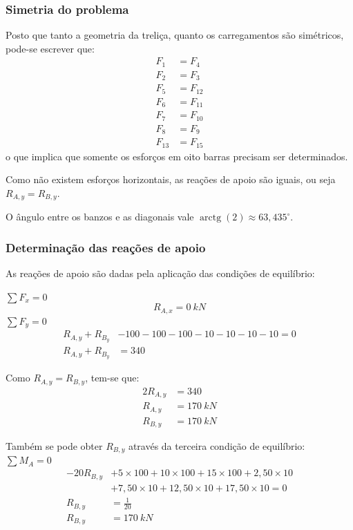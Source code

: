 \documentclass[a4paper, 12pt]{article} %
\DeclareMathOperator{\arctg}{arctg}
\begin{document}
\subsubsection{Simetria do problema}
Posto que tanto a geometria da treliça, quanto os carregamentos são simétricos, pode-se escrever que:
\begin{align}
F_1 &= F_4 \\
F_2 &= F_3 \\
F_5 &= F_{12} \\
F_6 &= F_{11} \\
F_7 &= F_{10} \\
F_8 &= F_9 \\
F_{13} &= F_{15} 
\end{align}
o que implica que somente os esforços em oito barras precisam ser determinados. 

Como não existem esforços horizontais, as reações de apoio são iguais, ou seja $R_{A,y} = R_{B, y}$.

\def\angulodiagonais{63,435^\circ}
O ângulo entre os banzos e as diagonais vale $\arctg({2}) \approx \angulodiagonais$.

\subsubsection{Determinação das reações de apoio}

As reações de apoio são dadas pela aplicação das condições de equilíbrio:

{\noindent $\sum F_x = 0$}
\begin{equation}
    R_{A,x} = \qty{0}{kN}
\end{equation}
{\noindent $\sum F_y = 0$}
\begin{align}
      R_{A,y} + R_{B_y} &- 100 - 100 - 100 - 10 - 10 - 10 - 10 = 0\\
      R_{A,y} + R_{B_y} & = 340
\end{align}

Como $R_{A,y} = R_{B,y}$, tem-se que:
\begin{align}
    2R_{A,y} &= 340 \\
    R_{A,y} & = \qty{170}{kN} \\
    R_{B,y} & = \qty{170}{kN}
\end{align}

Também se pode obter $R_{B,y}$ através da terceira condição de equilíbrio:
{\noindent $\sum M_A = 0$}
\begin{align}
    -20R_{B,y} &+ 5\times 100 + 10\times 100 + 15\times 100 + 2,50\times 10 \\
               &+ 7,50\times10 + 12,50 \times 10 + 17,50\times 10 = 0\\
    R_{B, y}  &=\frac{1}{20}\\
    R_{B, y}  &= \qty{170}{kN}
\end{align}
\end{document}
